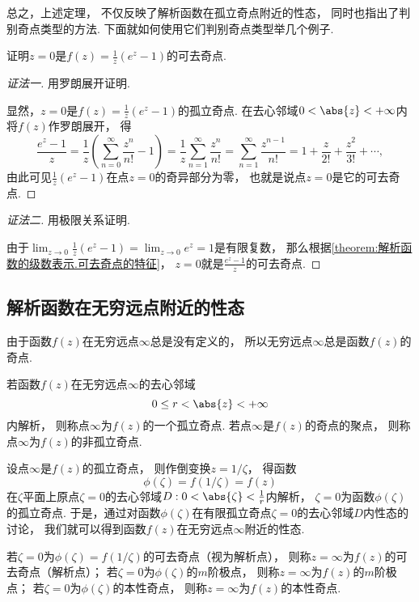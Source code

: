 总之，上述定理，
不仅反映了解析函数在孤立奇点附近的性态，
同时也指出了判别奇点类型的方法.
下面就如何使用它们判别奇点类型举几个例子.

\begin{example}
证明\(z=0\)是\(f(z) = \frac{1}{z} (e^z-1)\)的可去奇点.
\begin{proof}[证法一]
用罗朗展开证明.

显然，\(z=0\)是\(f(z) = \frac{1}{z} (e^z-1)\)的孤立奇点.
在去心邻域\(0<\abs{z}<+\infty\)内将\(f(z)\)作罗朗展开，
得\begin{equation*}
	\frac{e^z-1}{z}
	= \frac{1}{z} \left( \sum_{n=0}^\infty \frac{z^n}{n!} - 1 \right)
	= \frac{1}{z} \sum_{n=1}^\infty \frac{z^n}{n!}
	= \sum_{n=1}^\infty \frac{z^{n-1}}{n!}
	= 1 + \frac{z}{2!} + \frac{z^2}{3!} + \dotsb,
\end{equation*}
由此可见\(\frac{1}{z} (e^z-1)\)在点\(z=0\)的奇异部分为零，
也就是说点\(z=0\)是它的可去奇点.
\end{proof}
\begin{proof}[证法二]
用极限关系证明.

由于\(\lim_{z\to0} \frac{1}{z} (e^z-1) = \lim_{z\to0} e^z = 1\)是有限复数，
那么根据\cref{theorem:解析函数的级数表示.可去奇点的特征}，
\(z=0\)就是\(\frac{e^z-1}{z}\)的可去奇点.
\end{proof}
\end{example}

\subsection{解析函数在无穷远点附近的性态}
由于函数\(f(z)\)在无穷远点\(\infty\)总是没有定义的，
所以无穷远点\(\infty\)总是函数\(f(z)\)的奇点.

\begin{definition}
若函数\(f(z)\)在无穷远点\(\infty\)的去心邻域\begin{equation*}
	0 \leq r < \abs{z} < +\infty
\end{equation*}内解析，
则称点\(\infty\)为\(f(z)\)的一个孤立奇点.
若点\(\infty\)是\(f(z)\)的奇点的聚点，
则称点\(\infty\)为\(f(z)\)的非孤立奇点.
\end{definition}

设点\(\infty\)是\(f(z)\)的孤立奇点，
则作倒变换\(z = 1/\zeta\)，
得函数\begin{equation*}
	\phi(\zeta) = f(1/\zeta) = f(z)
\end{equation*}
在\(\zeta\)平面上原点\(\zeta=0\)的去心邻域\(D: 0<\abs{\zeta}<\frac{1}{r}\)内解析，
\(\zeta=0\)为函数\(\phi(\zeta)\)的孤立奇点.
于是，通过对函数\(\phi(\zeta)\)在有限孤立奇点\(\zeta=0\)的去心邻域\(D\)内性态的讨论，
我们就可以得到函数\(f(z)\)在无穷远点\(\infty\)附近的性态.
\begin{definition}\label{definition:解析函数的级数表示.无穷远处孤立奇点的分类}
若\(\zeta=0\)为\(\phi(\zeta)=f(1/\zeta)\)的可去奇点（视为解析点），
则称\(z=\infty\)为\(f(z)\)的可去奇点（解析点）；
若\(\zeta=0\)为\(\phi(\zeta)\)的\(m\)阶极点，
则称\(z=\infty\)为\(f(z)\)的\(m\)阶极点；
若\(\zeta=0\)为\(\phi(\zeta)\)的本性奇点，
则称\(z=\infty\)为\(f(z)\)的本性奇点.
\end{definition}

